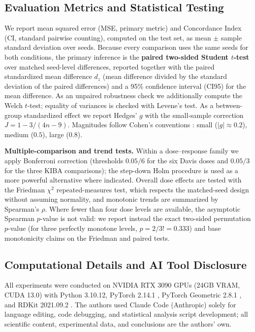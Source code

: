 \documentclass[10pt,a4paper,twocolumn]{article}
\begin{document}
\subsection{Evaluation Metrics and Statistical Testing}

We report mean squared error (MSE, primary metric) and Concordance Index (CI, standard pairwise counting), computed on the test set, as mean $\pm$ sample standard deviation over seeds. Because every comparison uses the same seeds for both conditions, the primary inference is the \textbf{paired two-sided Student $t$-test} over matched seed-level differences, reported together with the paired standardized mean difference $d_z$ (mean difference divided by the standard deviation of the paired differences) and a 95\% confidence interval (CI95) for the mean difference. As an unpaired robustness check we additionally compute the Welch $t$-test; equality of variances is checked with Levene's test. As a between-group standardized effect we report Hedges' $g$ \cite{hedges1981estimation} with the small-sample correction $J = 1 - 3/(4n - 9)$. Magnitudes follow Cohen's conventions \cite{cohen1988statistical}: small ($|g| \approx 0.2$), medium ($0.5$), large ($0.8$).

\textbf{Multiple-comparison and trend tests.} Within a dose--response family we apply Bonferroni correction (thresholds $0.05/6$ for the six Davis doses and $0.05/3$ for the three KIBA comparisons); the step-down Holm procedure \cite{holm1979simple} is used as a more powerful alternative where indicated. Overall dose effects are tested with the Friedman $\chi^2$ repeated-measures test, which respects the matched-seed design without assuming normality, and monotonic trends are summarized by Spearman's $\rho$. Where fewer than four dose levels are available, the asymptotic Spearman $p$-value is not valid: we report instead the exact two-sided permutation $p$-value (for three perfectly monotone levels, $p = 2/3! = 0.333$) and base monotonicity claims on the Friedman and paired tests.

\subsection{Computational Details and AI Tool Disclosure}

All experiments were conducted on NVIDIA RTX 3090 GPUs (24GB VRAM, CUDA 13.0) with Python 3.10.12, PyTorch 2.14.1 \cite{paszke2019pytorch}, PyTorch Geometric 2.8.1 \cite{fey2019pyg}, and RDKit 2021.09.2 \cite{landrum_rdkit}. The authors used Claude Code (Anthropic) solely for language editing, code debugging, and statistical analysis script development; all scientific content, experimental data, and conclusions are the authors' own.
\end{document}
